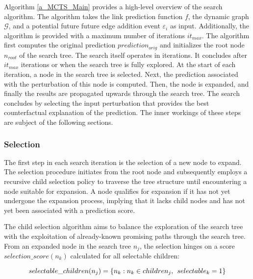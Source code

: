 Algorithm \ref{a_MCTS_Main} provides a high-level overview of the search algorithm. The algorithm takes the link prediction function $f$, the dynamic graph $\mathcal{G}$, and a potential future future edge addition event $\varepsilon_i$ as input. Additionally, the algorithm is provided with a maximum number of iterations $it_{max}$. The algorithm first computes the original prediction $prediction_{orig}$ and initializes the root node $n_{root}$ of the search tree. The search itself operates in iterations. It concludes after $it_{max}$ iterations or when the search tree is fully explored. At the start of each iteration, a node in the search tree is selected. Next, the prediction associated with the perturbation of this node is computed. Then, the node is expanded, and finally the results are propagated upwards through the search tree. The search concludes by selecting the input perturbation that provides the best counterfactual explanation of the prediction. The inner workings of these steps are subject of the following sections.


\subsubsection{Selection}
\label{s_Methodology_CoDy_Selection}
The first step in each search iteration is the selection of a new node to expand. The selection procedure initiates from the root node and subsequently employs a recursive child selection policy to traverse the tree structure until encountering a node suitable for expansion. A node qualifies for expansion if it has not yet undergone the expansion process, implying that it lacks child nodes and has not yet been associated with a prediction score.

The child selection algorithm aims to balance the exploration of the search tree with the exploitation of already-known promising paths through the search tree. From an expanded node in the search tree $n_j$, the selection hinges on a score $selection\_score(n_k)$ calculated for all selectable children:

\begin{equation}
    selectable\_children(n_j) = \{n_k: n_k \in children_j, \hspace{1.5mm} selectable_k = 1\}
\end{equation}

